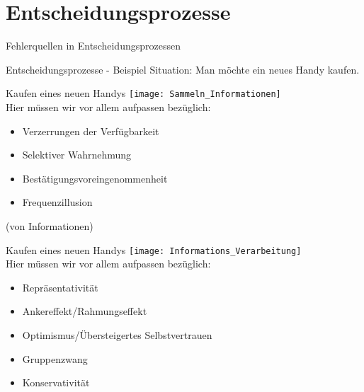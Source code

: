 \section{Entscheidungsprozesse}

\begin{frame}[c]{Fehlerquellen in Entscheidungsprozessen}
    \centering
\end{frame}

\begin{frame}[c]{Entscheidungsprozesse - Beispiel}
    \Large
    Situation: Man möchte ein neues Handy kaufen. \\
\end{frame}


\begin{frame}[c]{Kaufen eines neuen Handys}
    \texttt{[image: Sammeln\_Informationen]} \\
    \pause
    Hier müssen wir vor allem aufpassen bezüglich:
    \begin{itemize}[<+(1)->]
        \item Verzerrungen der Verfügbarkeit
        \item Selektiver Wahrnehmung
        \item Bestätigungsvoreingenommenheit
        \item Frequenzillusion
    \end{itemize}
    (von Informationen)
\end{frame}


\begin{frame}[c]{Kaufen eines neuen Handys}
    \texttt{[image: Informations\_Verarbeitung]} \\
    \pause
    Hier müssen wir vor allem aufpassen bezüglich:
    \begin{itemize}[<+(1)->]
        \item Repräsentativität
        \item Ankereffekt/Rahmungseffekt
        \item Optimismus/Übersteigertes Selbstvertrauen
        \item Gruppenzwang
        \item Konservativität
    \end{itemize}
\end{frame}


